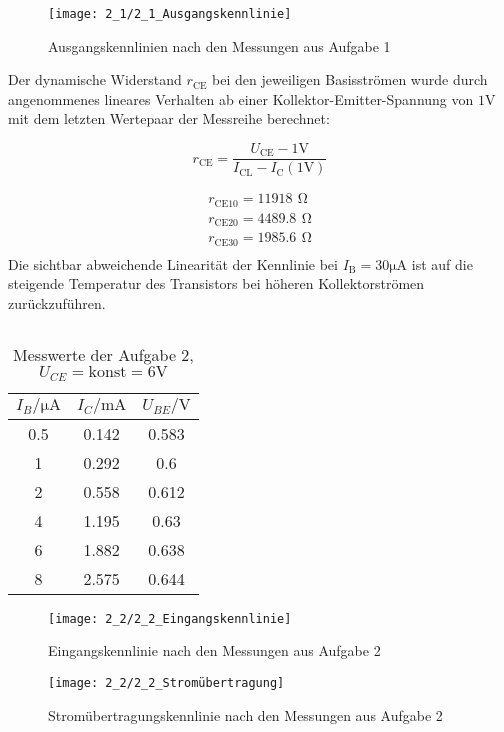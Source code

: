 \documentclass[a4paper, 12pt]{article}
\begin{document}
\begin{figure}[H]
  \begin{center}
    \texttt{[image: 2\_1/2\_1\_Ausgangskennlinie]}
  \end{center}
  \caption{Ausgangskennlinien nach den Messungen aus Aufgabe 1}
\end{figure}

Der dynamische Widerstand $r_\textrm{CE}$ bei den jeweiligen Basisströmen wurde durch
angenommenes lineares Verhalten ab einer Kollektor-Emitter-Spannung von $1
\si{\volt}$ mit dem letzten Wertepaar der Messreihe berechnet:

$$r_\textrm{CE} = \frac{U_\textrm{CE} - 1 \si{\volt}}{ I_\textrm{CL} -
  I_\textrm{C}(1 \si{\volt})} $$

\begin{gather*}
  r_\textrm{CE10} = 11918 \,\ \si{\ohm}\\
  r_\textrm{CE20} = 4489.8 \,\ \si{\ohm}\\
  r_\textrm{CE30} = 1985.6\,\ \si{\ohm}\\
\end{gather*}
Die sichtbar abweichende Linearität der Kennlinie bei $I_\textrm{B} = 30
\si{\micro\ampere}$ ist auf die steigende Temperatur des Transistors bei höheren
Kollektorströmen zurückzuführen.

\subsection{}

\begin{table}[H]
  \begin{center}
\begin{tabular}{@{}ccc@{}}
\toprule
$I_B / \si{\micro\ampere}$  & $I_C / \si{\milli\ampere}$    & $U_{BE} / \si{\volt}$  \\ \midrule 
0.5 & 0.142 & 0.583    \\
1   & 0.292 & 0.6      \\
2   & 0.558 & 0.612    \\
4   & 1.195 & 0.63     \\
6   & 1.882 & 0.638    \\
8   & 2.575 & 0.644    \\ \bottomrule
\end{tabular}
\end{center}
\caption{ Messwerte der Aufgabe 2, $U_{CE} = \textrm{konst} = 6 \si{\volt}$}
\end{table}

\begin{figure}[H]
  \begin{center}
    \texttt{[image: 2\_2/2\_2\_Eingangskennlinie]}
  \end{center}
  \caption{Eingangskennlinie nach den Messungen aus Aufgabe 2}
\end{figure}

\begin{figure}[H]
  \begin{center}
    \texttt{[image: 2\_2/2\_2\_Stromübertragung]}
  \end{center}
  \caption{Stromübertragungskennlinie nach den Messungen aus Aufgabe 2}
\end{figure}
\end{document}
